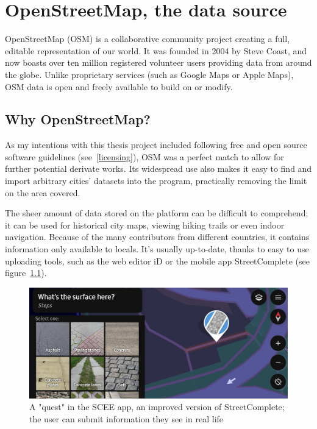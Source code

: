\chapter{OpenStreetMap, the data source}

OpenStreetMap (OSM) is a collaborative community project creating a full, editable representation of our world. It was founded in 2004 by Steve Coast, and now boasts over ten million registered volunteer users providing data from around the globe. Unlike proprietary services (such as Google Maps or Apple Maps), OSM data is open and freely available to build on or modify.\cite{osmHistory}

\section{Why OpenStreetMap?}

As my intentions with this thesis project included following free and open source software guidelines (see~\ref{licensing}), OSM was a perfect match to allow for further potential derivate works. Its widespread use also makes it easy to find and import arbitrary cities' datasets into the program, practically removing the limit on the area covered.

The sheer amount of data stored on the platform can be difficult to comprehend; it can be used for historical city maps, viewing hiking trails or even indoor navigation. Because of the many contributors from different countries, it contains information only available to locals. It's usually up-to-date, thanks to easy to use uploading tools, such as the web editor iD or the mobile app StreetComplete (see figure~\ref{scee}).

\begin{figure}[h]
    \centering
    \includegraphics[width=140mm, keepaspectratio]{images/scee_example.jpg}
    \caption{A "quest" in the SCEE app, an improved version of StreetComplete; the user can submit information they see in real life \label{scee}}
\end{figure}

